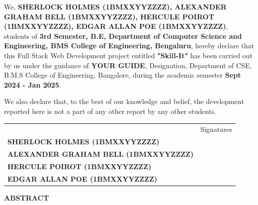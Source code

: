     \begin{spacing}{1.25}
        
        \noindent
        \large We, \textbf{SHERLOCK HOLMES (1BMXXYYZZZZ), ALEXANDER GRAHAM BELL (1BMXXYYZZZZ), HERCULE POIROT (1BMXXYYZZZZ), EDGAR ALLAN POE (1BMXXYYZZZZ)}, students of \textbf{3rd Semester, B.E, Department of Computer Science and Engineering, BMS College of Engineering, Bengaluru}, hereby declare that this Full Stack Web Development project entitled \textbf{"Skill-It"} has been carried out by us under the guidance of \textbf{YOUR GUIDE}, Designation, Department of CSE, B.M.S College of Engineering, Bangalore, during the academic semester \textbf{Sept 2024 - Jan 2025}.

        \noindent
        \Large We also declare that, to the best of our knowledge and belief, the development reported here is not a part of any other report by any other students.
        
        \vspace{1cm}
        \setlength\tabcolsep{0pt}
        \noindent
        \begingroup
        \fontsize{14pt}{12pt}
        \begin{tabulary}{\linewidth}{LR}
            & Signatures \\
            \textbf{SHERLOCK HOLMES (1BMXXYYZZZZ)} & \\
            \textbf{ALEXANDER GRAHAM BELL (1BMXXYYZZZZ)} & \\
            \textbf{HERCULE POIROT (1BMXXYYZZZZ)} & \\
            \textbf{EDGAR ALLAN POE (1BMXXYYZZZZ)} & \\
        \end{tabulary}
        \endgroup
    \end{spacing}
\clearpage
    \begin{center}
    \Large \textbf{ABSTRACT}
    \end{center}
    \begin{spacing}{2.0}
        \lipsum[0-5]
    \end{spacing}


